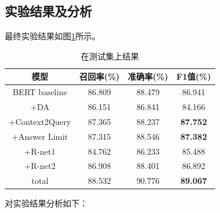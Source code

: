 \documentclass[10pt, a4]{extarticle}
\begin{document}
\subsection{实验结果及分析}
最终实验结果如图\ref{result}所示。
\begin{table}[H]
	\centering
	\caption{在测试集上结果}
	\begin{tabular}{cccc}
		\toprule  %
		模型 & 召回率(\%)  & 准确率(\%) & F1值(\%)   \\
		\midrule  %
		BERT baseline  & 86.809 & 88.479 & 86.941 \\
		+DA            & 86.151 & 86.841 & 84.166 \\
		+Context2Query & 87.365 & 88.237 & \textbf{87.752} \\
		+Answer Limit  & 87.315 & 88.546 & \textbf{87.382} \\
		+R-net1        & 84.762 & 86.233 & 85.488 \\
		+R-net2        & 86.908 & 88.401 & 86.892 \\
		\midrule  %
		total          & 88.532 & 90.776 & \textbf{89.067} \\
		\bottomrule %
	\end{tabular}
	\label{result}
\end{table}
对实验结果分析如下：
\end{document}
